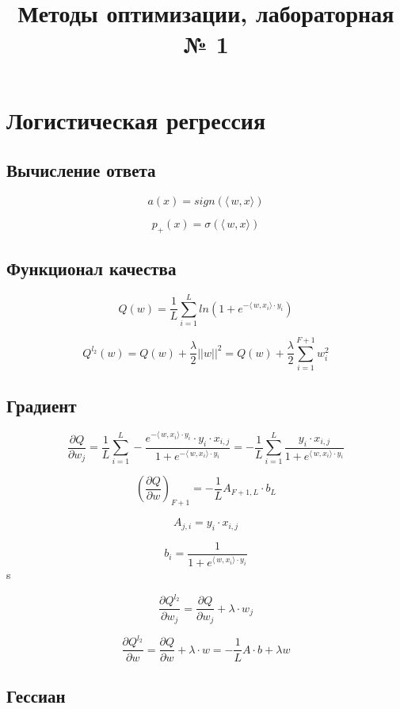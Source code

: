 \documentclass[12pt]{article}
\title{Методы оптимизации, лабораторная № 1}
\begin{document}
	\maketitle
	
\section{Логистическая регрессия}

\subsection{Вычисление ответа}
$$a(x) = sign(\langle\,w,x\rangle)$$

$$p_+(x) = \sigma(\langle\,w,x\rangle)$$

\subsection{Функционал качества}

$$Q(w) = \frac{1}{L}\sum\limits_{i = 1}^L ln(1 + e^{-\langle\,w,x_i\rangle\cdot y_i})$$

$$Q^{l_2}(w) = Q(w) + \frac{\lambda}{2}||w||^2 = Q(w) + \frac{\lambda}{2} \sum\limits_{i = 1}^{F+1}w_i^2$$

\subsection{Градиент}

$$\frac{\partial Q}{\partial w_j} = \frac{1}{L}\sum\limits_{i = 1}^{L}-\frac{e^{-\langle\,w,x_i\rangle\cdot y_i} \cdot y_i \cdot x_{i, j}}{1 + e^{-\langle\,w,x_i\rangle\cdot y_i}} = -\frac{1}{L}\sum\limits_{i = 1}^{L}\frac{y_i \cdot x_{i, j}}{1 + e^{\langle\,w,x_i\rangle\cdot y_i}} $$

\[ 
\left( \frac{\partial Q}{\partial w} \right)_{F+1} =-\frac{1}{L} A_{F+1, L} \cdot b_{L}
\]

$$A_{j, i} = y_{i} \cdot x_{i, j}$$

$$b_i = \frac{1}{1 + e^{\langle\,w,x_i\rangle\cdot y_i}}$$s

$$\frac{\partial Q^{l_2}}{\partial w_j} = \frac{\partial Q}{\partial w_j}  + \lambda \cdot w_j $$

$$\frac{\partial Q^{l_2}}{\partial w} = \frac{\partial Q}{\partial w}  + \lambda \cdot w = -\frac{1}{L} A \cdot b + \lambda w$$

\subsection{Гессиан}
\end{document}
